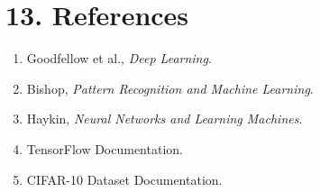 \documentclass[11pt]{article}
\begin{document}
\section*{13. References}

\begin{enumerate}
\item Goodfellow et al., \emph{Deep Learning}.
\item Bishop, \emph{Pattern Recognition and Machine Learning}.
\item Haykin, \emph{Neural Networks and Learning Machines}.
\item TensorFlow Documentation.
\item CIFAR-10 Dataset Documentation.
\end{enumerate}
\end{document}
